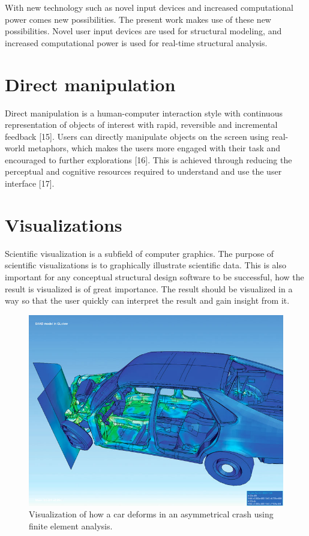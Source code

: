 With new technology such as novel input devices and increased computational power comes new possibilities. The present work makes use of these new possibilities. Novel user input devices are used for structural modeling, and increased computational power is used for real-time structural analysis. 

\section{Direct manipulation}
Direct manipulation is a human-computer interaction style with continuous representation of objects of interest with rapid, reversible and incremental feedback [15]. Users can directly manipulate objects on the screen using real-world metaphors, which makes the users more engaged with their task and encouraged to further explorations [16]. This is achieved through reducing the perceptual and cognitive resources required to understand and use the user interface [17].

\section{Visualizations}
Scientific visualization is a subfield of computer graphics. The purpose of scientific visualizations is to graphically illustrate scientific data. This is also important for any conceptual structural design software to be successful, how the result is visualized is of great importance. The result should be visualized in a way so that the user quickly can interpret the result and gain insight from it. 

\begin{figure}
  \includegraphics[width=350pt]{graphics/car.jpg}
  \caption{Visualization of how a car deforms in an asymmetrical crash using finite element analysis.}
  \label{fig:Car}
\end{figure}

